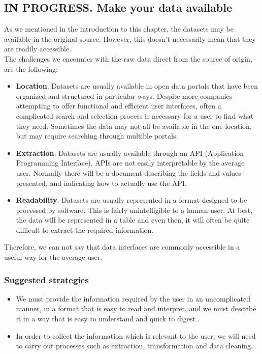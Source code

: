 \subsection{IN PROGRESS. Make your data available}
    
As we mentioned in the introduction to this chapter, the datasets may be available in the original source. However, this doesn't necessarily
mean that they are readily accessible.\\

The challenges we encounter with the raw data direct from the source of origin, are the following:

\begin{itemize}
    \item \textbf{Location}. Datasets are usually available in open data portals that have been organized and structured in particular ways.
    Despite more companies attempting to offer functional and efficient user interfaces, often a complicated search and selection process is necessary for a user to find what they need.
    Sometimes the data may not all be available in the one location, but may require searching through multible portals.

    \item \textbf{Extraction}. Datasets are usually available through an API (Application Programming Interface). APIs are not easily interpretable by the average user.
    Normally there will be a document describing the fields and values presented, and indicating how to actually use the API. \\

    \item \textbf{Readability}. Datasets are usually represented in a format designed to be processed by software. This is fairly unintelligible to a human user. At best,
    the data will be represented in a table and even then, it will often be quite difficult to extract the required information.
\end{itemize}

Therefore, we can not say that data interfaces are commonly accessible in a useful way for the average user. \\

\subsubsection*{Suggested strategies} 

\begin{itemize}
    \item We must provide the information required by the user in an uncomplicated manner, in a format that is easy to read and interpret,
          and we must describe it in a way that is easy to understand and quick to digest..\\
    \item In order to collect the information which is relevant to the user, we will need to carry out processes such as extraction, transformation and
          data cleaning.
\end{itemize}
 
